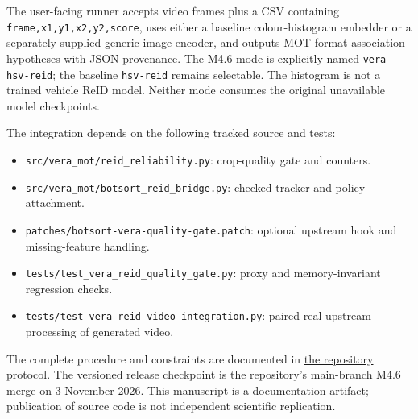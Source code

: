 \documentclass[11pt,a4paper]{article}
\newcommand{\codestr}[1]{\texttt{#1}}
\begin{document}
The user-facing runner accepts video frames plus a CSV containing \codestr{frame,x1,y1,x2,y2,score}, uses either a baseline colour-histogram embedder or a separately supplied generic image encoder, and outputs MOT-format association hypotheses with JSON provenance. The M4.6 mode is explicitly named \codestr{vera-hsv-reid}; the baseline \codestr{hsv-reid} remains selectable. The histogram is not a trained vehicle ReID model. Neither mode consumes the original unavailable model checkpoints.

The integration depends on the following tracked source and tests:
\begin{itemize}
\item \codestr{src/vera\_mot/reid\_reliability.py}: crop-quality gate and counters.
\item \codestr{src/vera\_mot/botsort\_reid\_bridge.py}: checked tracker and policy attachment.
\item \codestr{patches/botsort-vera-quality-gate.patch}: optional upstream hook and missing-feature handling.
\item \codestr{tests/test\_vera\_reid\_quality\_gate.py}: proxy and memory-invariant regression checks.
\item \codestr{tests/test\_vera\_reid\_video\_integration.py}: paired real-upstream processing of generated video.
\end{itemize}
The complete procedure and constraints are documented in \href{https://github.com/n0711/vera-mot/blob/main/docs/VERA_REID_RELIABILITY.md}{the repository protocol}. The versioned release checkpoint is the repository's main-branch M4.6 merge on 3 November 2026. This manuscript is a documentation artifact; publication of source code is not independent scientific replication.
\end{document}
